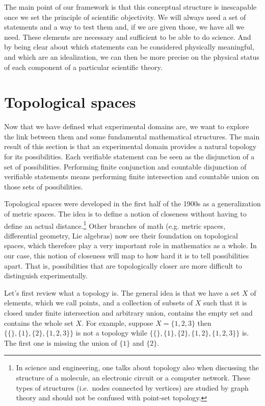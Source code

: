 	The main point of our framework is that this conceptual structure is inescapable once we set the principle of scientific objectivity. We will always need a set of statements and a way to test them and, if we are given those, we have all we need. These elements are necessary and sufficient to be able to do science. And by being clear about which statements can be considered physically meaningful, and which are an idealization, we can then be more precise on the physical status of each component of a particular scientific theory.
	
	\section{Topological spaces}
	
	Now that we have defined what experimental domains are, we want to explore the link between them and some fundamental mathematical structures. The main result of this section is that an experimental domain provides a natural topology for its possibilities. Each verifiable statement can be seen as the disjunction of a set of possibilities. Performing finite conjunction and countable disjunction of verifiable statements means performing finite intersection and countable union on those sets of possibilities.
	
	Topological spaces were developed in the first half of the 1900s as a generalization of metric spaces. The idea is to define a notion of closeness without having to define an actual distance.\footnote{In science and engineering, one talks about topology also when discussing the structure of a molecule, an electronic circuit or a computer network. These types of structures (i.e.~nodes connected by vertices) are studied by graph theory and should not be confused with point-set topology.} Other branches of math (e.g. metric spaces, differential geometry, Lie algebras) now see their foundation on topological spaces, which therefore play a very important role in mathematics as a whole. In our case, this notion of closeness will map to how hard it is to tell possibilities apart. That is, possibilities that are topologically closer are more difficult to distinguish experimentally.
	
	Let's first review what a topology is. The general idea is that we have a set $X$ of elements, which we call points, and a collection of subsets of $X$ such that it is closed under finite intersection and arbitrary union, contains the empty set and contains the whole set $X$. For example, suppose $X=\{1,2,3\}$ then $\{\{\}, \{1\}, \{2\},\{1,2,3\}\}$ is not a topology while $\{\{\}, \{1\}, \{2\},\{1,2\},\{1,2,3\}\}$ is. The first one is missing the union of $\{1\}$ and $\{2\}$.
	
